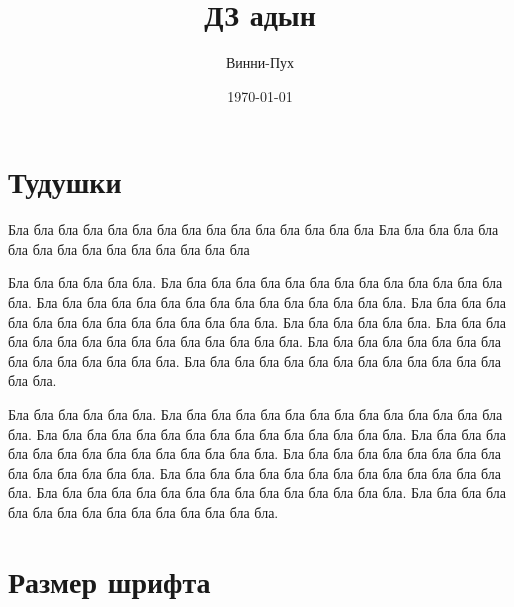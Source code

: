 \documentclass[12pt, a4paper]{article}
\title{ДЗ адын}
\author{Винни-Пух}
\date{\today}  %
\begin{document}

\maketitle

\tableofcontents

\section{Тудушки}

Бла бла бла бла бла бла бла бла бла бла бла бла бла бла бла   Бла бла бла бла бла бла бла бла бла бла бла бла бла бла бла

Бла бла бла бла бла бла. Бла бла бла бла бла бла бла бла бла бла бла бла бла бла бла. Бла бла бла бла бла бла бла бла бла бла бла бла бла бла бла. Бла бла бла бла бла бла бла бла бла бла бла бла бла бла бла. Бла бла бла бла бла бла. Бла бла бла бла бла бла бла бла бла бла бла бла бла бла бла. Бла бла бла бла бла бла бла бла бла бла бла бла бла бла бла. Бла бла бла бла бла бла бла бла бла бла бла бла бла бла бла.
  
Бла бла бла бла бла бла. Бла бла бла бла бла бла бла бла бла бла бла бла бла бла бла. Бла бла бла бла бла бла бла бла бла бла бла бла бла бла бла. Бла бла бла бла бла бла бла бла бла бла бла бла бла бла бла. Бла бла бла бла бла бла бла бла бла  бла бла бла бла бла бла. Бла бла бла бла бла бла бла бла бла бла бла бла бла бла бла. Бла бла бла бла бла бла бла бла бла бла бла бла бла бла бла. Бла бла бла бла бла бла бла бла бла бла бла бла бла бла бла.

\vspace{2cm}


\vspace{2cm}



\newpage %

\section{Размер шрифта} 
\end{document}
